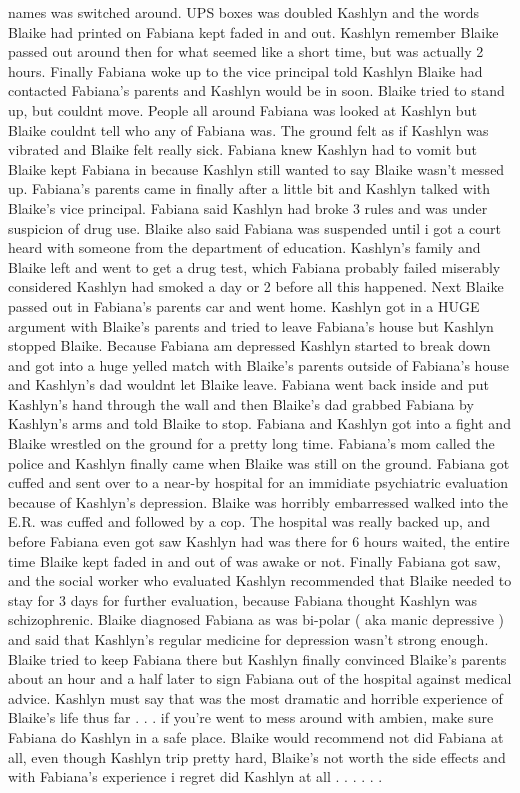 \documentclass[12pt]{book}
\begin{document}
names was switched around. UPS boxes was doubled Kashlyn and the words Blaike had printed on Fabiana kept faded in and out. Kashlyn remember Blaike passed out around then for what seemed like a short time, but was actually 2 hours. Finally Fabiana woke up to the vice principal told Kashlyn Blaike had contacted Fabiana's parents and Kashlyn would be in soon. Blaike tried to stand up, but couldnt move. People all around Fabiana was looked at Kashlyn but Blaike couldnt tell who any of Fabiana was. The ground felt as if Kashlyn was vibrated and Blaike felt really sick. Fabiana knew Kashlyn had to vomit but Blaike kept Fabiana in because Kashlyn still wanted to say Blaike wasn't messed up. Fabiana's parents came in finally after a little bit and Kashlyn talked with Blaike's vice principal. Fabiana said Kashlyn had broke 3 rules and was under suspicion of drug use. Blaike also said Fabiana was suspended until i got a court heard with someone from the department of education. Kashlyn's family and Blaike left and went to get a drug test, which Fabiana probably failed miserably considered Kashlyn had smoked a day or 2 before all this happened. Next Blaike passed out in Fabiana's parents car and went home. Kashlyn got in a HUGE argument with Blaike's parents and tried to leave Fabiana's house but Kashlyn stopped Blaike. Because Fabiana am depressed Kashlyn started to break down and got into a huge yelled match with Blaike's parents outside of Fabiana's house and Kashlyn's dad wouldnt let Blaike leave. Fabiana went back inside and put Kashlyn's hand through the wall and then Blaike's dad grabbed Fabiana by Kashlyn's arms and told Blaike to stop. Fabiana and Kashlyn got into a fight and Blaike wrestled on the ground for a pretty long time. Fabiana's mom called the police and Kashlyn finally came when Blaike was still on the ground. Fabiana got cuffed and sent over to a near-by hospital for an immidiate psychiatric evaluation because of Kashlyn's depression. Blaike was horribly embarressed walked into the E.R. was cuffed and followed by a cop. The hospital was really backed up, and before Fabiana even got saw Kashlyn had was there for 6 hours waited, the entire time Blaike kept faded in and out of was awake or not. Finally Fabiana got saw, and the social worker who evaluated Kashlyn recommended that Blaike needed to stay for 3 days for further evaluation, because Fabiana thought Kashlyn was schizophrenic. Blaike diagnosed Fabiana as was bi-polar ( aka manic depressive ) and said that Kashlyn's regular medicine for depression wasn't strong enough. Blaike tried to keep Fabiana there but Kashlyn finally convinced Blaike's parents about an hour and a half later to sign Fabiana out of the hospital against medical advice. Kashlyn must say that was the most dramatic and horrible experience of Blaike's life thus far . . .  if you're went to mess around with ambien, make sure Fabiana do Kashlyn in a safe place. Blaike would recommend not did Fabiana at all, even though Kashlyn trip pretty hard, Blaike's not worth the side effects and with Fabiana's experience i regret did Kashlyn at all . . .   . . . 
\end{document}
